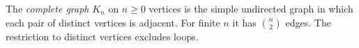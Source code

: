
The \emph{complete graph} $K_n$ on $n\ge0$ vertices is the simple undirected graph in which each pair of distinct vertices is adjacent. For finite $n$ it has $\binom n2$ edges. The restriction to distinct vertices excludes loops.
